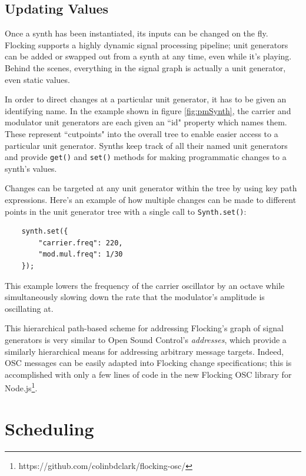 \documentclass{article}
\begin{document}
\subsection{Updating Values}

Once a synth has been instantiated, its inputs can be changed on the fly. Flocking supports a highly dynamic signal processing pipeline; unit generators can be added or swapped out from a synth at any time, even while it's playing. Behind the scenes, everything in the signal graph is actually a unit generator, even static values.

In order to direct changes at a particular unit generator, it has to be given an identifying name. In the example shown in figure \ref{fig:pmSynth}, the carrier and modulator unit generators are each given an ``id" property which names them. These represent ``cutpoints" into the overall tree to enable easier access to a particular unit generator. Synths keep track of all their named unit generators and provide \verb|get()| and \verb|set()| methods for making programmatic changes to a synth's values.

Changes can be targeted at any unit generator within the tree by using key path expressions. Here's an example of how multiple changes can be made to different points in the unit generator tree with a single call to \verb|Synth.set()|:

\begin{verbatim}
    synth.set({
        "carrier.freq": 220,
        "mod.mul.freq": 1/30
    });
\end{verbatim}

This example lowers the frequency of the carrier oscillator by an octave while simultaneously slowing down the rate that the modulator's amplitude is oscillating at.

This hierarchical path-based scheme for addressing Flocking's graph of signal generators is very similar to Open Sound Control's {\it addresses}, which provide a similarly hierarchical means for addressing arbitrary message targets. Indeed, OSC messages can be easily adapted into Flocking change specifications; this is accomplished with only a few lines of code in the new Flocking OSC library for Node.js\footnote{https://github.com/colinbdclark/flocking-osc/}.

\section{Scheduling} \label{sec:Scheduling}
\end{document}

